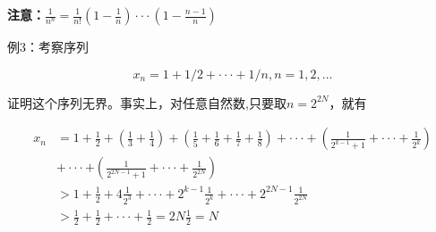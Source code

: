 \documentclass{ctexart}
\begin{document}
	\textbf{注意：}\(\frac{1}{n^n} = \frac{1}{n!}(1-\frac{1}{n})···(1-\frac{n-1}{n})\)
	
	例3：考察序列
	
	\[x_n=1+1/2+···+1/n, n=1,2,...\]
	
	证明这个序列无界。事实上，对任意自然数,只要取\(n=2^{2N}\)，就有
	
	\begin{align*}
	x_n &= 1+\frac{1}{2}+(\frac{1}{3}+\frac{1}{4})+(\frac{1}{5}+\frac{1}{6}+\frac{1}{7}+\frac{1}{8})+···+(\frac{1}{2^{k-1}+1}+···+\frac{1}{2^k}) \\
	&+···+(\frac{1}{2^{2N-1}+1}+···+\frac{1}{2^{2N}}) \\
	& > 1+\frac{1}{2}+4\frac{1}{2^3}+···+2^{k-1}\frac{1}{2^k}+···+2^{2N-1}\frac{1}{2^{2N}} \\
	& > \frac{1}{2}+\frac{1}{2}+···+\frac{1}{2} = 2N\frac{1}{2}=N\\
	\end{align*}
	
	
	
\end{document}
